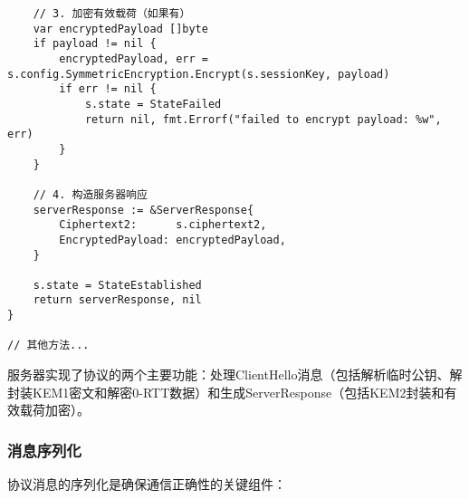 \begin{verbatim}
    // 3. 加密有效载荷（如果有）
    var encryptedPayload []byte
    if payload != nil {
        encryptedPayload, err = s.config.SymmetricEncryption.Encrypt(s.sessionKey, payload)
        if err != nil {
            s.state = StateFailed
            return nil, fmt.Errorf("failed to encrypt payload: %w", err)
        }
    }

    // 4. 构造服务器响应
    serverResponse := &ServerResponse{
        Ciphertext2:      s.ciphertext2,
        EncryptedPayload: encryptedPayload,
    }

    s.state = StateEstablished
    return serverResponse, nil
}

// 其他方法...
\end{verbatim}

服务器实现了协议的两个主要功能：处理ClientHello消息（包括解析临时公钥、解封装KEM1密文和解密0-RTT数据）和生成ServerResponse（包括KEM2封装和有效载荷加密）。

\subsubsection{消息序列化}

协议消息的序列化是确保通信正确性的关键组件：


